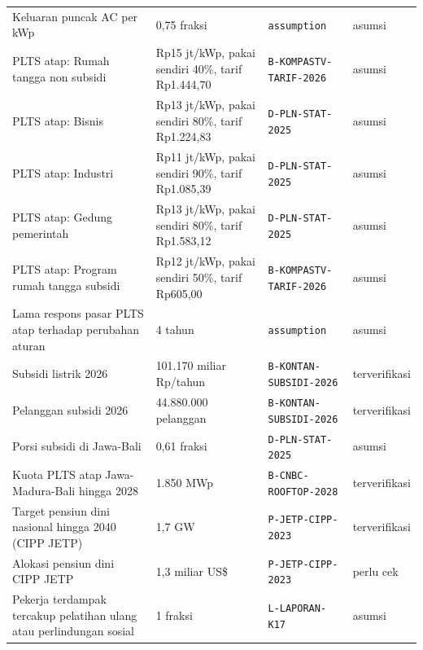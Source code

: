 \begin{longtable}{p{} p{} p{} p{}}
Keluaran puncak AC per kWp & 0,75 fraksi & \texttt{assumption} & asumsi \\
PLTS atap: Rumah tangga non subsidi & Rp15 jt/kWp, pakai sendiri 40\%, tarif Rp1.444,70 & \texttt{B-\allowbreak{}KOMPASTV-\allowbreak{}TARIF-\allowbreak{}2026} & asumsi \\
PLTS atap: Bisnis & Rp13 jt/kWp, pakai sendiri 80\%, tarif Rp1.224,83 & \texttt{D-\allowbreak{}PLN-\allowbreak{}STAT-\allowbreak{}2025} & asumsi \\
PLTS atap: Industri & Rp11 jt/kWp, pakai sendiri 90\%, tarif Rp1.085,39 & \texttt{D-\allowbreak{}PLN-\allowbreak{}STAT-\allowbreak{}2025} & asumsi \\
PLTS atap: Gedung pemerintah & Rp13 jt/kWp, pakai sendiri 80\%, tarif Rp1.583,12 & \texttt{D-\allowbreak{}PLN-\allowbreak{}STAT-\allowbreak{}2025} & asumsi \\
PLTS atap: Program rumah tangga subsidi & Rp12 jt/kWp, pakai sendiri 50\%, tarif Rp605,00 & \texttt{B-\allowbreak{}KOMPASTV-\allowbreak{}TARIF-\allowbreak{}2026} & asumsi \\
Lama respons pasar PLTS atap terhadap perubahan aturan & 4 tahun & \texttt{assumption} & asumsi \\
Subsidi listrik 2026 & 101.170 miliar Rp/tahun & \texttt{B-\allowbreak{}KONTAN-\allowbreak{}SUBSIDI-\allowbreak{}2026} & terverifikasi \\
Pelanggan subsidi 2026 & 44.880.000 pelanggan & \texttt{B-\allowbreak{}KONTAN-\allowbreak{}SUBSIDI-\allowbreak{}2026} & terverifikasi \\
Porsi subsidi di Jawa-Bali & 0,61 fraksi & \texttt{D-\allowbreak{}PLN-\allowbreak{}STAT-\allowbreak{}2025} & asumsi \\
Kuota PLTS atap Jawa-Madura-Bali hingga 2028 & 1.850 MWp & \texttt{B-\allowbreak{}CNBC-\allowbreak{}ROOFTOP-\allowbreak{}2028} & terverifikasi \\
Target pensiun dini nasional hingga 2040 (CIPP JETP) & 1,7 GW & \texttt{P-\allowbreak{}JETP-\allowbreak{}CIPP-\allowbreak{}2023} & terverifikasi \\
Alokasi pensiun dini CIPP JETP & 1,3 miliar US\$ & \texttt{P-\allowbreak{}JETP-\allowbreak{}CIPP-\allowbreak{}2023} & perlu cek \\
Pekerja terdampak tercakup pelatihan ulang atau perlindungan sosial & 1 fraksi & \texttt{L-\allowbreak{}LAPORAN-\allowbreak{}K17} & asumsi \\
\bottomrule
\end{longtable}
